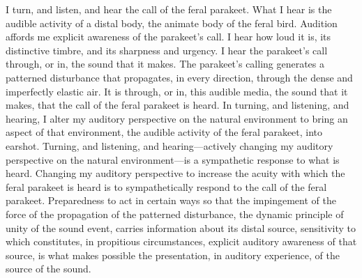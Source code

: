 \documentclass[12pt]{article}
\begin{document}
I turn, and listen, and hear the call of the feral parakeet. What I hear is the audible activity of a distal body, the animate body of the feral bird. Audition affords me explicit awareness of the parakeet’s call. I hear how loud it is, its distinctive timbre, and its sharpness and urgency. I hear the parakeet's call through, or in, the sound that it makes. The parakeet's calling generates a patterned disturbance that propagates, in every direction, through the dense and imperfectly elastic air. It is through, or in, this audible media, the sound that it makes, that the call of the feral parakeet is heard. In turning, and listening, and hearing, I alter my auditory perspective on the natural environment to bring an aspect of that environment, the audible activity of the feral parakeet, into earshot. Turning, and listening, and hearing---actively changing my auditory perspective on the natural environment---is a sympathetic response to what is heard. Changing my auditory perspective to increase the acuity with which the feral parakeet is heard is to sympathetically respond to the call of the feral parakeet. Preparedness to act in certain ways so that the impingement of the force of the propagation of the patterned disturbance, the dynamic principle of unity of the sound event, carries information about its distal source, sensitivity to which constitutes, in propitious circumstances, explicit auditory awareness of that source, is what makes possible the presentation, in auditory experience, of the source of the sound. 


\nocite{Shields:2016ix}
\nocite{Hett:1936fk}
\nocite{Locke:1975pi}
\nocite{Lindberg:1998dy}
\nocite{Hobbes:1904hw}
\nocite{Descartes:1985df}

 
 
\end{document}
